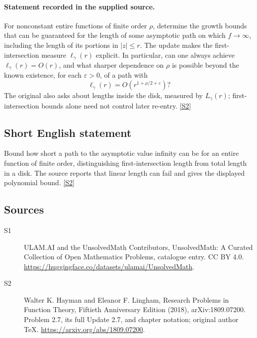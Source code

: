 \documentclass[11pt]{article}
\newcommand{\sref}[2]{\hyperlink{source:#1:#2}{[S#2]}}
\begin{document}
\paragraph{Statement recorded in the supplied source.}
For nonconstant entire functions of finite order $\rho$, determine the growth bounds that can be guaranteed for the length of some asymptotic path on which $f\to\infty$, including the length of its portions in $|z|\le r$. The update makes the first-intersection measure $\ell_\gamma(r)$ explicit. In particular, can one always achieve $\ell_\gamma(r)=O(r)$, and what sharper dependence on $\rho$ is possible beyond the known existence, for each $\varepsilon>0$, of a path with
\[
 \ell_\gamma(r)=O(r^{1+\rho/2+\varepsilon})?
\]
The original also asks about lengths inside the disk, measured by $L_\gamma(r)$; first-intersection bounds alone need not control later re-entry. \sref{statement}{2}
\subsection{Short English statement}
Bound how short a path to the asymptotic value infinity can be for an entire function of finite order, distinguishing first-intersection length from total length in a disk. The source reports that linear length can fail and gives the displayed polynomial bound. \sref{statement}{2}
\subsection{Sources}
\begin{description}
\item[\hypertarget{source:statement:1}{S1}] ULAM.AI and the UnsolvedMath Contributors, UnsolvedMath: A Curated Collection of Open Mathematics Problems, catalogue entry. CC BY 4.0. \url{https://huggingface.co/datasets/ulamai/UnsolvedMath}.
\item[\hypertarget{source:statement:2}{S2}] Walter K. Hayman and Eleanor F. Lingham, Research Problems in Function Theory, Fiftieth Anniversary Edition (2018), arXiv:1809.07200. Problem 2.7, its full Update 2.7, and chapter notation; original author TeX. \url{https://arxiv.org/abs/1809.07200}.
\end{description}
\label{end:statement}
\end{document}
